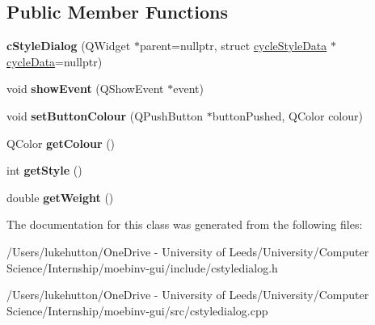 \subsection*{Public Member Functions}
\begin{DoxyCompactItemize}
\item 
\mbox{\label{classc_style_dialog_a5807725382c046b8d7ce6d69d3b596e2}} 
{\bfseries c\+Style\+Dialog} (Q\+Widget $\ast$parent=nullptr, struct \mbox{\hyperlink{structcycle_style_data}{cycle\+Style\+Data}} $\ast$\mbox{\hyperlink{structcycle_data}{cycle\+Data}}=nullptr)
\item 
\mbox{\label{classc_style_dialog_aa74af6b1f34d43ce800e3ad343c11de7}} 
void {\bfseries show\+Event} (Q\+Show\+Event $\ast$event)
\item 
\mbox{\label{classc_style_dialog_a69eb66937adf137641436896cd1c90d7}} 
void {\bfseries set\+Button\+Colour} (Q\+Push\+Button $\ast$button\+Pushed, Q\+Color colour)
\item 
\mbox{\label{classc_style_dialog_a6a48c4f7602f96dc42dfd53f5cae9a6a}} 
Q\+Color {\bfseries get\+Colour} ()
\item 
\mbox{\label{classc_style_dialog_a87856188bacb34ce4c3d654bc91e3adb}} 
int {\bfseries get\+Style} ()
\item 
\mbox{\label{classc_style_dialog_a6ba1b5aae4bfc925f832a85cb237e4af}} 
double {\bfseries get\+Weight} ()
\end{DoxyCompactItemize}


The documentation for this class was generated from the following files\+:\begin{DoxyCompactItemize}
\item 
/\+Users/lukehutton/\+One\+Drive -\/ University of Leeds/\+University/\+Computer Science/\+Internship/moebinv-\/gui/include/cstyledialog.\+h\item 
/\+Users/lukehutton/\+One\+Drive -\/ University of Leeds/\+University/\+Computer Science/\+Internship/moebinv-\/gui/src/cstyledialog.\+cpp\end{DoxyCompactItemize}
